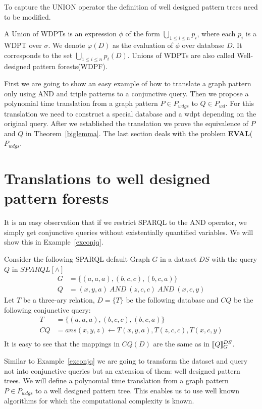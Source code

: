 To capture the UNION operator the definition of well designed pattern trees
need to be modified.  
\begin{definition}
	A Union of WDPTs is an expression $\phi$ of the form $\bigcup_{1\leq i \leq n} p_i$, 
	where each $p_i$ is a WDPT over $\sigma$.
	We denote $\varphi(D)$ as the evaluation of $\phi$ over database $D$.
	It corresponds to the set $\bigcup_{1\leq i \leq n}p_i(D)$.
	Unions of WDPTs are also called Well-designed pattern
	forests(WDPF).
\end{definition}



First we are going to show an easy example of how to translate a graph pattern
only using AND and triple patterns to a conjunctive query. Then we propose a
polynomial time translation from a graph pattern $P \in P_{wdgs}$ to $Q \in P_{wd}$. For this
translation we need to construct a special database and a wdpt depending on the
original query. After we established the translation we prove the equivalence of $P$ and $Q$ in
Theorem~\ref{biglemma}. The last section deals with the problem
\textbf{EVAL}($P_{wdgs}$.

\section{Translations to well designed pattern forests}
It is an easy observation that if we restrict SPARQL to the AND operator, we
simply get conjunctive queries without existentially quantified variables.
We will show this in Example~\ref{exconjq}. 
\begin{example}\label{exconjq}
	Consider the following SPARQL default Graph $G$ in a dataset $DS$ with the query $Q$ in $SPARQL[\land]$
	\begin{align*}
		G &=\{ (a,a,a), (b,c,c), (b,c,a)  \}\\
		Q &= (x,y,a) \ AND \ (z,c,c) \ AND \ (x,c,y)
	\end{align*}
	Let $T$ be a three-ary relation, $D = \{ T \}$ be the following database and
	$CQ$ be the following 
	conjunctive query: 
	\begin{align*}
		T &= \{ (a,a,a), (b,c,c), (b,c,a)\}\\
		CQ &= ans(x,y,z) \leftarrow T(x,y,a), T(z,c,c), T(x,c,y)\\
	\end{align*}
	It is easy to see that the mappings in $CQ(D)$ are the same as in $\llbracket Q
	\rrbracket_G^{DS}$.
\end{example}
Similar to Example~\ref{exconjq} we are going to transform the dataset and query 
not into conjunctive queries but an extension of them: well designed pattern
trees. We 
will define a polynomial time translation from a graph pattern $P \in P_{wdgs}$
to a well designed pattern tree. This enables us to use well known algorithms 
for which the computational complexity is known. 


